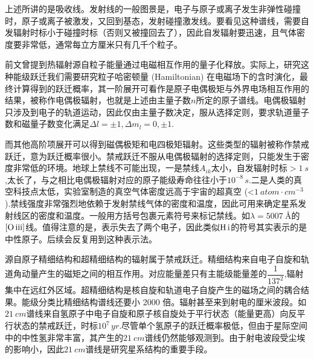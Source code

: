 \documentclass[../天体物理基础.tex]{subfiles}
\begin{document}
上述所讲的是吸收线。发射线的一般图景是，电子与原子或离子发生非弹性碰撞时，原子或离子被激发，又回到基态，发射碰撞激发线。要看见这种谱线，需要自发辐射时标小于碰撞时标（否则又被撞回去了），因此自发辐射要迅速，且气体密度要非常低，通常每立方厘米只有几千个粒子。

前文曾提到热辐射源自粒子能量通过电磁相互作用的量子化释放。实际上，研究这种能级跃迁我们需要研究粒子哈密顿量 (Hamiltonian) 在电磁场下的含时演化，最终计算得到的跃迁概率，其一阶展开可看作是原子电偶极矩与外界电场相互作用的结果，被称作电偶极辐射，也就是上述由主量子数$n$所定的原子谱线。电偶极辐射只涉及到电子的轨道运动，因此仅由主量子数决定，服从选择定则，要求轨道量子数和磁量子数变化满足$\Delta{}l=\pm1,\Delta{}m_{l}=0,\pm1$.

而其他高阶项展开可以得到磁偶极矩和电四极矩辐射。这些类型的辐射被称作禁戒跃迁，意为跃迁概率很小。禁戒跃迁不服从电偶极辐射的选择定则，只能发生于密度非常低的环境。地球上禁线不可能出现，一是禁线$A_{ik}$太小，自发辐射时标$>\qty{1}{s}$,太长了，与之相比电偶极辐射对应的原子能级寿命往往小于$10^{-8}\,\unit{s}$.二是人类的真空科技点太低，实验室制造的真空气体密度远高于宇宙的超真空 (<$\qty{1}{atom\cdot cm^{-3}}$).禁线强度非常强烈地依赖于发射禁线气体的密度和温度，因此可用来确定星系发射线区的密度和温度。一般用方括号包裹元素符号来标记禁线。如$\lambda=\qty{5007}{\angstrom}$的$\left[\ce{O}\,\mathrm{\uppercase\expandafter{\romannumeral3}}\right]$线。值得注意的是，\uppercase\expandafter{}表示失去了两个电子，因此类似$\ce{H}\,\mathrm{\uppercase\expandafter{\romannumeral1}}$的符号其实表示的是中性原子。后续会反复用到这种表示法。

源自原子精细结构和超精细结构的辐射属于禁戒跃迁。精细结构来自电子自旋和轨道角动量产生的磁矩之间的相互作用。对应能量差只有主能级能量差的$\dfrac{1}{137^{2}}$,辐射集中在远红外区域。超精细结构是核自旋和轨道电子自旋产生的磁场之间的耦合结果。能级分类比精细结构谱线还要小 2000 倍。辐射甚至来到射电的厘米波段。如$\qty{21}{cm}$谱线来自氢原子中电子自旋和原子核自旋处于平行状态（能量更高）向反平行状态的禁戒跃迁，时标$10^{7}\,\unit{yr}$.尽管单个氢原子的跃迁概率极低，但由于星际空间中的中性氢非常丰富，其产生的$\qty{21}{cm}$谱线仍然能够观测到。由于射电波段受尘埃的影响小，因此$\qty{21}{cm}$谱线是研究星系结构的重要手段。
\end{document}
